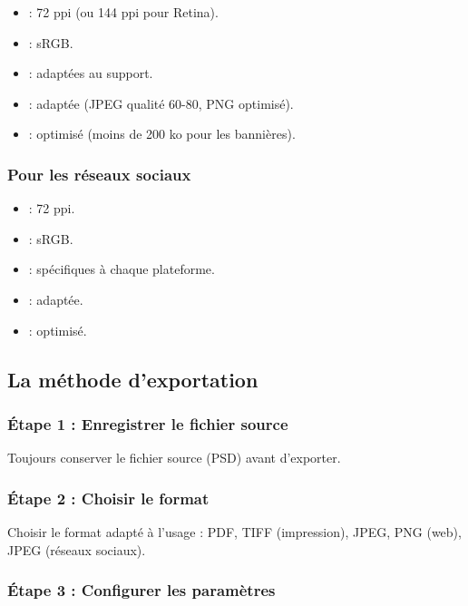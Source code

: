 \begin{itemize}
    \item {} : 72 ppi (ou 144 ppi pour Retina).
    \item {} : sRGB.
    \item {} : adaptées au support.
    \item {} : adaptée (JPEG qualité 60-80, PNG optimisé).
    \item {} : optimisé (moins de 200 ko pour les bannières).
\end{itemize}

\subsubsection{Pour les réseaux sociaux}

\begin{itemize}
    \item {} : 72 ppi.
    \item {} : sRGB.
    \item {} : spécifiques à chaque plateforme.
    \item {} : adaptée.
    \item {} : optimisé.
\end{itemize}

\subsection{La méthode d'exportation}

\subsubsection{Étape 1 : Enregistrer le fichier source}

Toujours conserver le fichier source (PSD) avant d'exporter.

\subsubsection{Étape 2 : Choisir le format}

Choisir le format adapté à l'usage : PDF, TIFF (impression), JPEG, PNG (web), JPEG (réseaux sociaux).

\subsubsection{Étape 3 : Configurer les paramètres}

